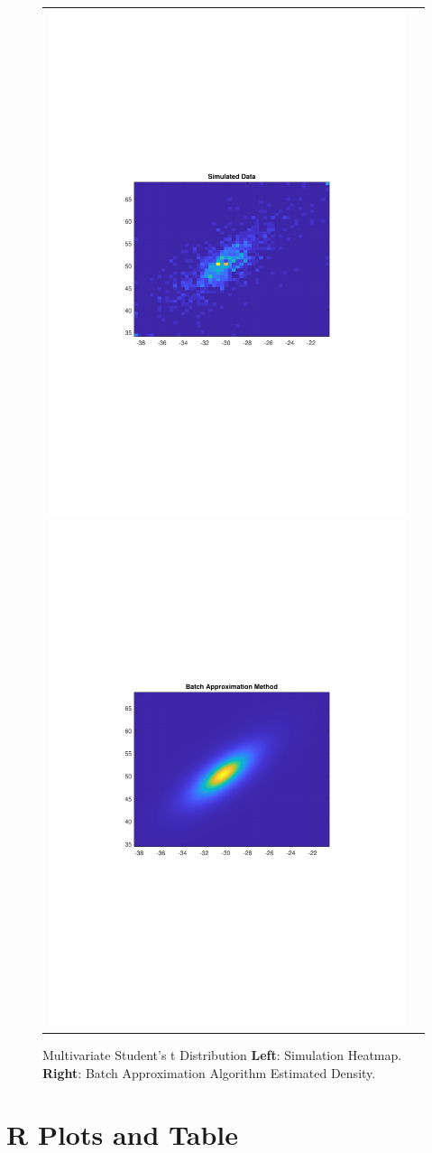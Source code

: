 \documentclass{article}
\begin{document}
\begin{figure}[!htb]\center 
    \begin{tabular}{cc}
        \includegraphics[width=0.5\linewidth, trim = {5cm 10cm 4cm 10cm}, clip]{heat_hist.pdf}
        \includegraphics[width=0.5\linewidth,trim = {5cm 10cm 4cm 10cm}, clip]{heat_batch_approx.pdf}
    \end{tabular}
    \caption{\footnotesize Multivariate Student's t Distribution \textbf{Left}: Simulation Heatmap. \textbf{Right}: Batch Approximation Algorithm Estimated Density.}
    \label{fig1}
\end{figure}

\section{R Plots and Table}
\end{document}
